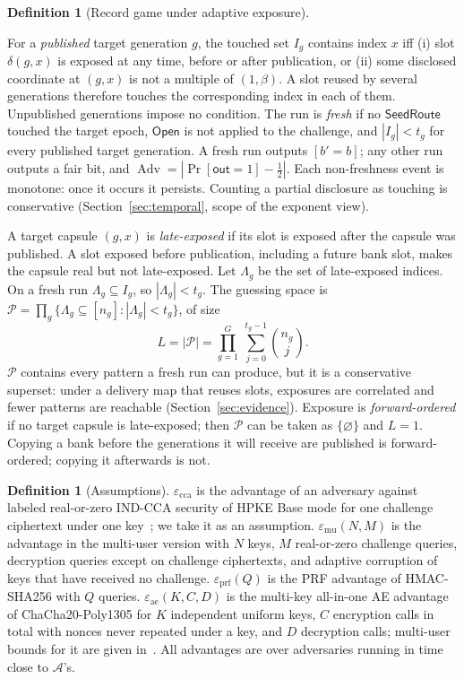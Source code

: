 \documentclass[pdflatex,sn-mathphys-num]{sn-jnl}
\theoremstyle{plain}
\theoremstyle{definition}
\newtheorem{definition}[theorem]{Definition}
\newcommand{\Adv}{\operatorname{Adv}}
\begin{document}
\begin{definition}[Record game under adaptive exposure]
\begin{enumerate}
\end{enumerate}
For a \emph{published} target generation $g$, the touched set $I_g$ contains index $x$ iff (i) slot $\delta(g,x)$ is exposed at any time, before or after publication, or (ii) some disclosed coordinate at $(g,x)$ is not a multiple of $(1,\beta)$. A slot reused by several generations therefore touches the corresponding index in each of them. Unpublished generations impose no condition. The run is \emph{fresh} if no $\mathsf{SeedRoute}$ touched the target epoch, $\mathsf{Open}$ is not applied to the challenge, and $|I_g|<t_g$ for every published target generation. A fresh run outputs $[b'=b]$; any other run outputs a fair bit, and $\Adv=|\Pr[\mathsf{out}=1]-\tfrac12|$. Each non-freshness event is monotone: once it occurs it persists. Counting a partial disclosure as touching is conservative (Section~\ref{sec:temporal}, scope of the exponent view).
\end{definition}

A target capsule $(g,x)$ is \emph{late-exposed} if its slot is exposed after the capsule was published. A slot exposed before publication, including a future bank slot, makes the capsule real but not late-exposed. Let $\Lambda_g$ be the set of late-exposed indices. On a fresh run $\Lambda_g\subseteq I_g$, so $|\Lambda_g|<t_g$. The guessing space is $\mathcal P=\prod_g\{\Lambda_g\subseteq[n_g]:|\Lambda_g|<t_g\}$, of size
\begin{equation}\label{eq:L}
 L=|\mathcal P|=\prod_{g=1}^{G}\ \sum_{j=0}^{t_g-1}\binom{n_g}{j}.
\end{equation}
$\mathcal P$ contains every pattern a fresh run can produce, but it is a conservative superset: under a delivery map that reuses slots, exposures are correlated and fewer patterns are reachable (Section~\ref{sec:evidence}). Exposure is \emph{forward-ordered} if no target capsule is late-exposed; then $\mathcal P$ can be taken as $\{\varnothing\}$ and $L=1$. Copying a bank before the generations it will receive are published is forward-ordered; copying it afterwards is not.

\begin{definition}[Assumptions]
$\varepsilon_{\mathrm{cca}}$ is the advantage of an adversary against labeled real-or-zero IND-CCA security of HPKE Base mode for one challenge ciphertext under one key~\cite{rfc9180}; we take it as an assumption. $\varepsilon_{\mathrm{mu}}(N,M)$ is the advantage in the multi-user version with $N$ keys, $M$ real-or-zero challenge queries, decryption queries except on challenge ciphertexts, and adaptive corruption of keys that have received no challenge. $\varepsilon_{\mathrm{prf}}(Q)$ is the PRF advantage of HMAC-SHA256 with $Q$ queries. $\varepsilon_{\mathrm{ae}}(K,C,D)$ is the multi-key all-in-one AE advantage of ChaCha20-Poly1305 for $K$ independent uniform keys, $C$ encryption calls in total with nonces never repeated under a key, and $D$ decryption calls; multi-user bounds for it are given in~\cite{degabriele2021}. All advantages are over adversaries running in time close to $\mathcal A$'s.
\end{definition}
\end{document}
